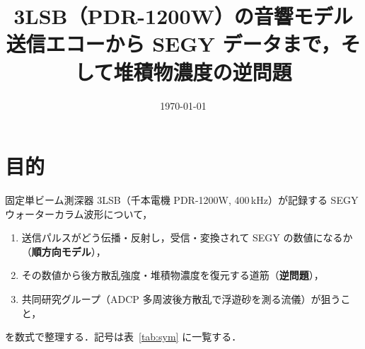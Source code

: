 \documentclass[11pt]{ltjsarticle}
\title{3LSB（PDR-1200W）の音響モデル\\\large 送信エコーから SEGY データまで，そして堆積物濃度の逆問題}
\author{}
\date{\today}
\begin{document}
\maketitle

\section{目的}
固定単ビーム測深器 3LSB（千本電機 PDR-1200W, 400\,kHz）が記録する SEGY ウォーターカラム波形について，
\begin{enumerate}[nosep]
  \item 送信パルスがどう伝播・反射し，受信・変換されて SEGY の数値になるか（\textbf{順方向モデル}），
  \item その数値から後方散乱強度・堆積物濃度を復元する道筋（\textbf{逆問題}），
  \item 共同研究グループ（ADCP 多周波後方散乱で浮遊砂を測る流儀）が狙うこと，
\end{enumerate}
を数式で整理する．記号は表~\ref{tab:sym} に一覧する．
\end{document}
